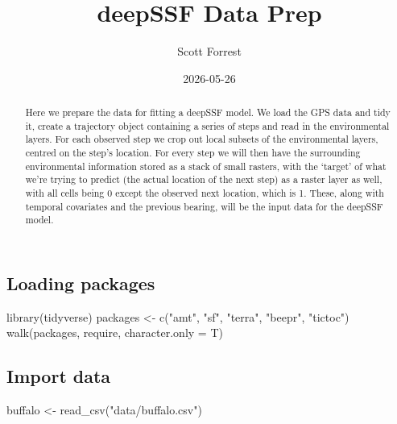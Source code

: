 \documentclass[
  letterpaper,
  DIV=11,
  numbers=noendperiod]{scrartcl}
\title{deepSSF Data Prep}
\author{Scott Forrest}
\date{2026-05-26}
\newenvironment{Shaded}{\begin{snugshade}}{\end{snugshade}}
\newcommand{\AttributeTok}[1]{\textcolor[rgb]{0.40,0.45,0.13}{#1}}
\newcommand{\FunctionTok}[1]{\textcolor[rgb]{0.28,0.35,0.67}{#1}}
\newcommand{\NormalTok}[1]{\textcolor[rgb]{0.00,0.23,0.31}{#1}}
\newcommand{\OtherTok}[1]{\textcolor[rgb]{0.00,0.23,0.31}{#1}}
\newcommand{\StringTok}[1]{\textcolor[rgb]{0.13,0.47,0.30}{#1}}
\renewcommand*\contentsname{Table of contents}
\newcommand\contentsname{Table of contents}
\begin{document}
\maketitle
\begin{abstract}
Here we prepare the data for fitting a deepSSF model. We load the GPS
data and tidy it, create a trajectory object containing a series of
steps and read in the environmental layers. For each observed step we
crop out local subsets of the environmental layers, centred on the
step's location. For every step we will then have the surrounding
environmental information stored as a stack of small rasters, with the
`target' of what we're trying to predict (the actual location of the
next step) as a raster layer as well, with all cells being 0 except the
observed next location, which is 1. These, along with temporal
covariates and the previous bearing, will be the input data for the
deepSSF model.
\end{abstract}

\renewcommand*\contentsname{Table of contents}
{
\setcounter{tocdepth}{3}
\tableofcontents
}

\subsection{Loading packages}\label{loading-packages}

\begin{Shaded}
\begin{Highlighting}[]
\FunctionTok{library}\NormalTok{(tidyverse)}
\NormalTok{packages }\OtherTok{\textless{}{-}} \FunctionTok{c}\NormalTok{(}\StringTok{"amt"}\NormalTok{, }\StringTok{"sf"}\NormalTok{, }\StringTok{"terra"}\NormalTok{, }\StringTok{"beepr"}\NormalTok{, }\StringTok{"tictoc"}\NormalTok{)}
\FunctionTok{walk}\NormalTok{(packages, require, }\AttributeTok{character.only =}\NormalTok{ T)}
\end{Highlighting}
\end{Shaded}

\subsection{Import data}\label{import-data}

\begin{Shaded}
\begin{Highlighting}[]
\NormalTok{buffalo }\OtherTok{\textless{}{-}} \FunctionTok{read\_csv}\NormalTok{(}\StringTok{"data/buffalo.csv"}\NormalTok{)}
\end{Highlighting}
\end{Shaded}
\end{document}
